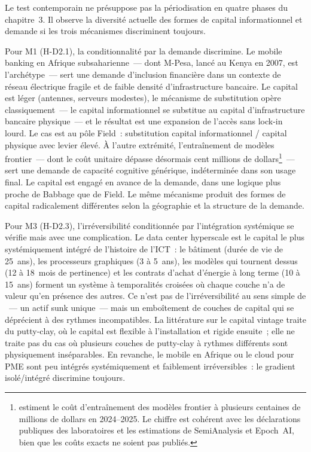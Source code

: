Le test contemporain ne présuppose pas la périodisation en quatre phases du chapitre~3. Il observe la diversité actuelle des formes de capital informationnel et demande si les trois mécanismes discriminent toujours.

Pour M1 (H-D2.1), la conditionnalité par la demande discrimine. Le mobile banking en Afrique subsaharienne~--- dont M-Pesa, lancé au Kenya en 2007, est l'archétype~--- sert une demande d'inclusion financière dans un contexte de réseau électrique fragile et de faible densité d'infrastructure bancaire. Le capital est léger (antennes, serveurs modestes), le mécanisme de substitution opère classiquement~--- le capital informationnel se substitue au capital d'infrastructure bancaire physique~--- et le résultat est une expansion de l'accès sans lock-in lourd. Le cas est au pôle Field~: substitution capital informationnel / capital physique avec levier élevé. À l'autre extrémité, l'entraînement de modèles frontier~--- dont le coût unitaire dépasse désormais cent millions de dollars\footnote{\textcite{cottier_rapid_2025} estiment le coût d'entraînement des modèles frontier à plusieurs centaines de millions de dollars en 2024--2025. Le chiffre est cohérent avec les déclarations publiques des laboratoires et les estimations de SemiAnalysis et Epoch~AI, bien que les coûts exacts ne soient pas publiés.}~--- sert une demande de capacité cognitive générique, indéterminée dans son usage final. Le capital est engagé en avance de la demande, dans une logique plus proche de Babbage que de Field. Le même mécanisme produit des formes de capital radicalement différentes selon la géographie et la structure de la demande.

Pour M3 (H-D2.3), l'irréversibilité conditionnée par l'intégration systémique se vérifie mais avec une complication. Le data center hyperscale est le capital le plus systémiquement intégré de l'histoire de l'ICT~: le bâtiment (durée de vie de 25~ans), les processeurs graphiques (3 à 5~ans), les modèles qui tournent dessus (12 à 18~mois de pertinence) et les contrats d'achat d'énergie à long terme (10 à 15~ans) forment un système à temporalités croisées où chaque couche n'a de valeur qu'en présence des autres. Ce n'est pas de l'irréversibilité au sens simple de \textcite{dixit_pindyck_1994}~--- un actif sunk unique~--- mais un emboîtement de couches de capital qui se déprécient à des rythmes incompatibles. La littérature sur le capital vintage \parencite{johansen_substitution_1959} traite du putty-clay, où le capital est flexible à l'installation et rigide ensuite~; elle ne traite pas du cas où plusieurs couches de putty-clay à rythmes différents sont physiquement inséparables. En revanche, le mobile en Afrique ou le cloud pour PME sont peu intégrés systémiquement et faiblement irréversibles~: le gradient isolé/intégré discrimine toujours.

